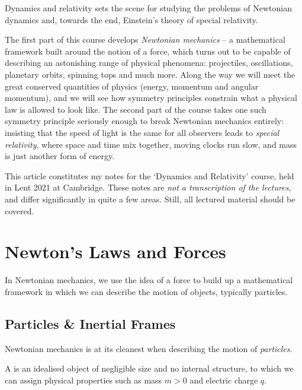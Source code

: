 

  

Dynamics and relativity sets the scene for studying the problems of Newtonian dynamics and, towards the end, Einstein's theory of special relativity.

The first part of this course develops \emph{Newtonian mechanics} -- a mathematical framework built around the notion of a force, which turns out to be capable of describing an astonishing range of physical phenomena: projectiles, oscillations, planetary orbits, spinning tops and much more. Along the way we will meet the great conserved quantities of physics (energy, momentum and angular momentum), and we will see how symmetry principles constrain what a physical law is allowed to look like. The second part of the course takes one such symmetry principle seriously enough to break Newtonian mechanics entirely: insisting that the speed of light is the same for all observers leads to \emph{special relativity}, where space and time mix together, moving clocks run slow, and mass is just another form of energy.

This article constitutes my notes for the `Dynamics and Relativity' course, held in Lent 2021 at Cambridge. These notes are \emph{not a transcription of the lectures}, and differ significantly in quite a few areas. Still, all lectured material should be covered.



\section{Newton's Laws and Forces}


In Newtonian mechanics, we use the idea of a force to build up a mathematical framework in which we can describe the motion of objects, typically particles.

\subsection{Particles \& Inertial Frames}

Newtonian mechanics is at its cleanest when describing the motion of \emph{particles}.

\begin{definition}[Particle]
	A  is an idealised object of negligible size and no internal structure, to which we can assign physical properties such as mass $m > 0$ and electric charge $q$.
\end{definition}

